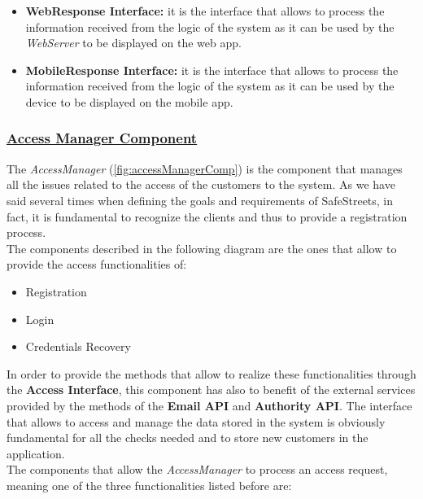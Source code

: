 \begin{itemize}
\begin{itemize}
					\item \textbf{WebResponse Interface:} it is the interface that allows to process the information received from the logic of the system as it can be used by the \emph{WebServer} to be displayed on the web app.
					
					\item \textbf{MobileResponse Interface:} it is the interface that allows to process the information received from the logic of the system as it can be used by the device to be displayed on the mobile app.
				\end{itemize}
			\end{itemize}
		
		\subsubsection[Access Manager Component]{\hyperlink{toc}{Access Manager Component}}
			\label{sec:accessManagerComponent}
			
			The \emph{AccessManager} (\autoref{fig:accessManagerComp}) is the component that manages all the issues related to the access of the customers to the system. As we have said several times when defining the goals and requirements of SafeStreets, in fact, it is fundamental to recognize the clients and thus to provide a registration process.\\
			
			The components described in the following diagram are the ones that allow to provide the access functionalities of:
			
			\begin{itemize}
				\item Registration
				\item Login
				\item Credentials Recovery
			\end{itemize}
		
			In order to provide the methods that allow to realize these functionalities through the \textbf{Access Interface}, this component has also to benefit of the external services provided by the methods of the \textbf{Email API} and \textbf{Authority API}. The interface that allows to access and manage the data stored in the system is obviously fundamental for all the checks needed and to store new customers in the application.\\
			
			The components that allow the \emph{AccessManager} to process an access request, meaning one of the three functionalities listed before are:
			
